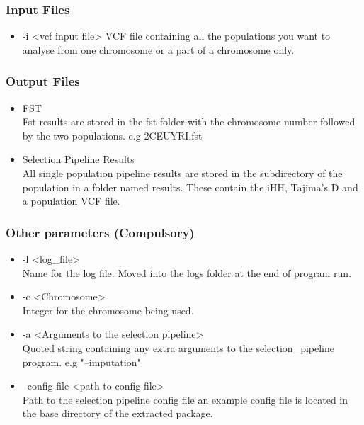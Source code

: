 \subsubsection{Input Files}
\begin{itemize}
\item -i <vcf input file>
VCF file containing all the populations you want to analyse from one chromosome or a part of a chromosome only. 
\end{itemize}
\subsubsection{Output Files}
\begin{itemize}
\item FST \\
Fst results are stored in the fst folder with the chromosome number followed by the two populations. e.g 2CEUYRI.fst
\item Selection Pipeline Results\\
All single population pipeline results are stored in the subdirectory of the population in a folder named results. These contain the iHH, Tajima's D and a population VCF file.
\end{itemize}
\subsubsection{Other parameters (Compulsory)}
\begin{itemize}
\item -l <log\_file> \\
Name for the log file. Moved into the logs folder at the end of program run.
\item -c <Chromosome>\\
Integer for the chromosome being used.
\item -a <Arguments to the selection pipeline>\\
Quoted string containing any extra arguments to the selection\_pipeline program. e.g "--imputation"
\item --config-file <path to config file>\\
Path to the selection pipeline config file an example config file is located in the base directory of the extracted package.
\end{itemize}
